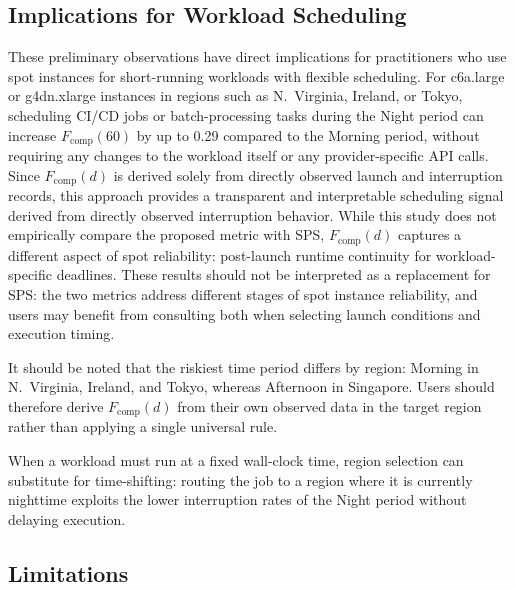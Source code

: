 \documentclass[runningheads]{llncs}
\begin{document}
\subsection{Implications for Workload Scheduling}

These preliminary observations have direct implications for practitioners who use spot instances for short-running workloads with flexible scheduling. For c6a.large or g4dn.xlarge instances in regions such as N.~Virginia, Ireland, or Tokyo, scheduling CI/CD jobs or batch-processing tasks during the Night period can increase $F_{\mathrm{comp}}(60)$ by up to 0.29 compared to the Morning period, without requiring any changes to the workload itself or any provider-specific API calls. Since $F_{\mathrm{comp}}(d)$ is derived solely from directly observed launch and interruption records, this approach provides a transparent and interpretable scheduling signal derived from directly observed interruption behavior. While this study does not empirically compare the proposed metric with SPS, $F_{\mathrm{comp}}(d)$ captures a different aspect of spot reliability: post-launch runtime continuity for workload-specific deadlines. These results should not be interpreted as a replacement for SPS: the two metrics address different stages of spot instance reliability, and users may benefit from consulting both when selecting launch conditions and execution timing.

It should be noted that the riskiest time period differs by region: Morning in N.~Virginia, Ireland, and Tokyo, whereas Afternoon in Singapore. Users should therefore derive $F_{\mathrm{comp}}(d)$ from their own observed data in the target region rather than applying a single universal rule.

When a workload must run at a fixed wall-clock time, region selection can substitute for time-shifting: routing the job to a region where it is currently nighttime exploits the lower interruption rates of the Night period without delaying execution.

\subsection{Limitations}
\end{document}

